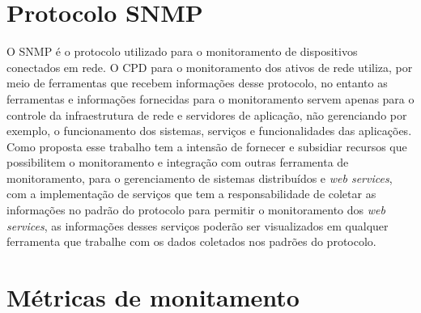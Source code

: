 
\section{Protocolo SNMP}
\label{integracao_snmp}
O SNMP é o protocolo utilizado para o monitoramento de dispositivos conectados em rede. O CPD para o monitoramento dos ativos de rede utiliza, por meio de ferramentas que recebem informações desse protocolo, no entanto as ferramentas e informações fornecidas para o monitoramento servem apenas para o controle da infraestrutura de rede e servidores de aplicação, não gerenciando por exemplo, o funcionamento dos sistemas, serviços e funcionalidades das aplicações. Como proposta esse trabalho tem a intensão de fornecer e subsidiar  recursos que possibilitem o monitoramento e integração com outras ferramenta de monitoramento, para o gerenciamento de sistemas distribuídos e \textit{web services}, com a implementação de serviços que tem a responsabilidade de coletar as informações no padrão do protocolo para permitir o monitoramento dos \textit{web services}, as informações desses serviços poderão ser visualizados em qualquer ferramenta que trabalhe com os dados coletados nos padrões do protocolo.           


\section{Métricas de monitamento}
\label{metricas_monitoramento}

